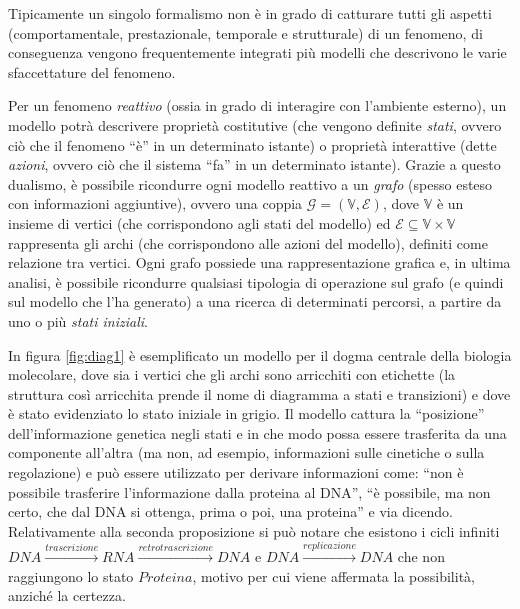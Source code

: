 		Tipicamente un singolo formalismo non \`e in  grado di catturare tutti gli aspetti (comportamentale, prestazionale, temporale e strutturale) di un fenomeno, di conseguenza vengono frequentemente integrati pi\`u modelli che descrivono le varie sfaccettature del fenomeno.
		
		Per un fenomeno \emph{reattivo} (ossia in grado di interagire con l'ambiente esterno), un modello potr\`a descrivere propriet\`a costitutive (che vengono definite \emph{stati}, ovvero ci\`o che il fenomeno ``\`e'' in un determinato istante) o propriet\`a interattive (dette \emph{azioni}, ovvero ci\`o che il sistema ``fa'' in un determinato istante).
		Grazie a questo dualismo, \`e possibile ricondurre ogni modello reattivo a un \emph{grafo} (spesso esteso con informazioni aggiuntive), ovvero una coppia $\mathcal{G} = (\mathbb{V}, \mathcal{E})$, dove $\mathbb{V}$ \`e un insieme di vertici (che corrispondono agli stati del modello) ed $\mathcal{E} \subseteq \mathbb{V} \times \mathbb{V}$ rappresenta gli archi (che corrispondono alle azioni del modello), definiti come relazione tra vertici.
		Ogni grafo possiede una rappresentazione grafica e, in ultima analisi, \`e possibile ricondurre qualsiasi tipologia di operazione sul grafo (e quindi sul modello che l'ha generato) a una ricerca di determinati percorsi, a partire da uno o pi\`u \emph{stati iniziali}.
		
		In figura \ref{fig:diag1} \`e esemplificato un modello per il dogma centrale della biologia molecolare, dove sia i vertici che gli archi sono arricchiti con etichette (la struttura cos\`i arricchita prende il nome di diagramma a stati e transizioni) e dove \`e stato evidenziato lo stato iniziale in grigio.
		Il modello cattura la ``posizione'' dell'informazione genetica negli stati e in che modo possa essere trasferita da una componente all'altra (ma non, ad esempio, informazioni sulle cinetiche o sulla regolazione) e pu\`o essere utilizzato per derivare informazioni come: ``non \`e possibile trasferire l'informazione dalla proteina al DNA'', ``\`e possibile, ma non certo, che dal DNA si ottenga, prima o poi, una proteina'' e via dicendo.
		Relativamente alla seconda proposizione si pu\`o notare che esistono i cicli infiniti $DNA \xrightarrow{trascrizione} RNA \xrightarrow{retrotrascrizione} DNA$ e $DNA \xrightarrow{replicazione} DNA$ che non raggiungono lo stato $Proteina$, motivo per cui viene affermata la possibilit\`a, anzich\'e la certezza.
		

